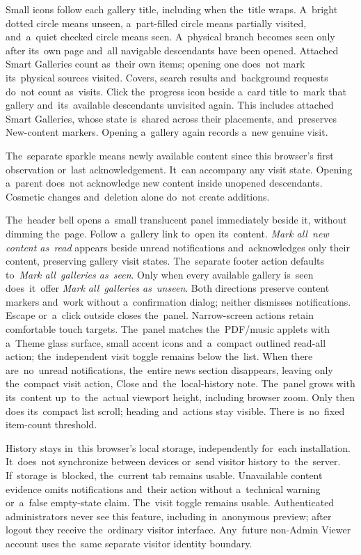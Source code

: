 \documentclass[11pt,a4paper]{article}
\begin{document}
Small icons follow each gallery title, including when the~title wraps. A~bright
dotted circle means unseen, a~part-filled circle means partially visited,
and~a~quiet checked
circle means seen. A~physical branch becomes seen only after its~own page
and~all
navigable descendants have been opened. Attached Smart Galleries count as~their
own items; opening one does~not mark its~physical sources visited. Covers,
search results and~background requests do~not count as~visits.
Click the~progress icon beside a~card title to~mark that gallery
and~its~available
descendants unvisited again. This includes attached Smart Galleries, whose
state is~shared across their placements, and~preserves New-content markers.
Opening a~gallery again records a~new genuine visit.

The~separate sparkle means newly available content since this browser's first
observation or~last acknowledgement. It~can accompany any visit state. Opening
a~parent does~not acknowledge new content inside unopened descendants. Cosmetic
changes and~deletion alone do~not create additions.

The~header bell opens a~small translucent panel immediately beside it, without
dimming the~page. Follow a~gallery link to~open its~content.
\emph{Mark all~new content as~read} appears beside unread notifications
and~acknowledges only their content, preserving gallery visit states.
The~separate footer action defaults to~\emph{Mark all~galleries as~seen}.
Only when every available gallery is~seen does~it~offer
\emph{Mark all~galleries as~unseen}. Both directions preserve content markers
and~work without a~confirmation dialog; neither dismisses notifications.
Escape or~a~click outside closes the~panel. Narrow-screen actions retain
comfortable touch targets. The~panel matches the~PDF/music applets with a~Theme
glass surface, small accent icons and~a~compact outlined read-all action;
the~independent visit toggle remains below the~list.
When there are~no~unread notifications, the~entire news section disappears,
leaving only the~compact visit action, Close and~the~local-history note.
The~panel grows with its~content up~to~the~actual viewport height, including
browser zoom. Only then does its~compact list scroll; heading and~actions stay
visible. There is~no~fixed item-count threshold.

History stays in~this browser's local storage, independently for~each
installation. It~does~not synchronize between devices or~send visitor history
to~the~server. If~storage is~blocked, the~current tab remains usable.
Unavailable
content evidence omits notifications and~their action without a~technical
warning or~a~false empty-state claim. The~visit toggle remains usable.
Authenticated administrators never see this feature, including in~anonymous
preview; after logout they receive the~ordinary visitor interface. Any~future
non-Admin Viewer account uses the~same separate visitor identity boundary.
\end{document}
